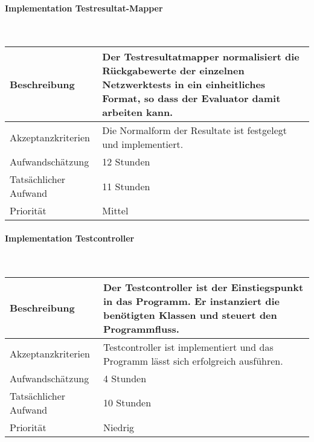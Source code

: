 \documentclass[]{subfiles}
\begin{document}
        \paragraph*{Implementation Testresultat-Mapper}\mbox{} \\
        \begin{tabularx}{\textwidth}{lX}
            \toprule
            Beschreibung & Der Testresultatmapper normalisiert die Rückgabewerte der einzelnen Netzwerktests in ein einheitliches Format, so dass der Evaluator damit arbeiten kann.\\
            \midrule
            Akzeptanzkriterien & Die Normalform der Resultate ist festgelegt und implementiert.\\
            \midrule
            Aufwandschätzung & 12 Stunden\\
            Tatsächlicher Aufwand & 11 Stunden \\
            \midrule
            Priorität & Mittel \\
            \bottomrule
        \end{tabularx}
    
        \paragraph*{Implementation Testcontroller}\mbox{} \\
        \begin{tabularx}{\textwidth}{lX}
            \toprule
            Beschreibung & Der Testcontroller ist der Einstiegspunkt in das Programm. Er instanziert die benötigten Klassen und steuert den Programmfluss.\\
            \midrule
            Akzeptanzkriterien & Testcontroller ist implementiert und das Programm lässt sich erfolgreich ausführen.\\
            \midrule
            Aufwandschätzung & 4 Stunden \\
            Tatsächlicher Aufwand & 10 Stunden \\
            \midrule
            Priorität & Niedrig \\
            \bottomrule
        \end{tabularx}
        \newpage
    
    
\end{document}
